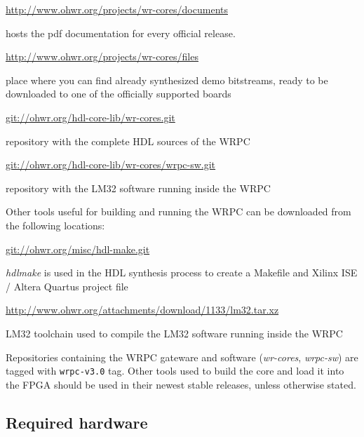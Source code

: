 \documentclass[a4paper, 12pt]{article}
\begin{document}
\begin{itemize*}

\item \url{http://www.ohwr.org/projects/wr-cores/documents}

	hosts the pdf documentation for every official release.

\item \url{http://www.ohwr.org/projects/wr-cores/files}

	place where you can find already synthesized demo bitstreams, ready to be
  downloaded to one of the officially supported boards

\item \url{git://ohwr.org/hdl-core-lib/wr-cores.git}

	repository with the complete HDL sources of the WRPC

\item \url{git://ohwr.org/hdl-core-lib/wr-cores/wrpc-sw.git}

  repository with the LM32 software running inside the WRPC

\end{itemize*}
Other tools useful for building and running the WRPC can be downloaded from the
following locations:

\begin{itemize*}

\item \url{git://ohwr.org/misc/hdl-make.git}

  \textit{hdlmake} is used in the HDL synthesis process to create a Makefile and
  Xilinx ISE / Altera Quartus project file

\item \url{http://www.ohwr.org/attachments/download/1133/lm32.tar.xz}

  LM32 toolchain used to compile the LM32 software running inside the WRPC

\end{itemize*}
Repositories containing the WRPC gateware and software (\textit{wr-cores},
\textit{wrpc-sw}) are tagged with \texttt{wrpc-v3.0} tag. Other tools used to
build the core and load it into the FPGA should be used in their newest stable
releases, unless otherwise stated.

\subsection{Required hardware}
\label{Required hardware}
\end{document}
